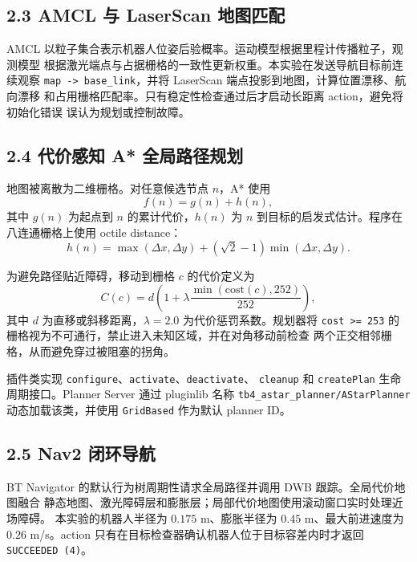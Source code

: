 \documentclass[12pt,a4paper]{ctexart}
\begin{document}
\subsection*{2.3 AMCL 与 LaserScan 地图匹配}

AMCL 以粒子集合表示机器人位姿后验概率。运动模型根据里程计传播粒子，观测模型
根据激光端点与占据栅格的一致性更新权重。本实验在发送导航目标前连续观察
\texttt{map -> base\_link}，并将 LaserScan 端点投影到地图，计算位置漂移、航向漂移
和占用栅格匹配率。只有稳定性检查通过后才启动长距离 action，避免将初始化错误
误认为规划或控制故障。

\subsection*{2.4 代价感知 A* 全局路径规划}

地图被离散为二维栅格。对任意候选节点 $n$，A* 使用
\begin{equation}
  f(n)=g(n)+h(n),
\end{equation}
其中 $g(n)$ 为起点到 $n$ 的累计代价，$h(n)$ 为 $n$ 到目标的启发式估计。程序在
八连通栅格上使用 octile distance：
\begin{equation}
  h(n)=\max(\Delta x,\Delta y)
  +(\sqrt{2}-1)\min(\Delta x,\Delta y).
\end{equation}

为避免路径贴近障碍，移动到栅格 $c$ 的代价定义为
\begin{equation}
  C(c)=d\left(1+\lambda\frac{\min(\mathrm{cost}(c),252)}{252}\right),
\end{equation}
其中 $d$ 为直移或斜移距离，$\lambda=2.0$ 为代价惩罚系数。规划器将
\texttt{cost >= 253} 的栅格视为不可通行，禁止进入未知区域，并在对角移动前检查
两个正交相邻栅格，从而避免穿过被阻塞的拐角。

插件类实现 \texttt{configure}、\texttt{activate}、\texttt{deactivate}、
\texttt{cleanup} 和 \texttt{createPlan} 生命周期接口。Planner Server 通过
pluginlib 名称 \texttt{tb4\_astar\_planner/AStarPlanner} 动态加载该类，并使用
\texttt{GridBased} 作为默认 planner ID。

\subsection*{2.5 Nav2 闭环导航}

BT Navigator 的默认行为树周期性请求全局路径并调用 DWB 跟踪。全局代价地图融合
静态地图、激光障碍层和膨胀层；局部代价地图使用滚动窗口实时处理近场障碍。
本实验的机器人半径为 $0.175$ m、膨胀半径为 $0.45$ m、最大前进速度为
$0.26$ m/s。action 只有在目标检查器确认机器人位于目标容差内时才返回
\texttt{SUCCEEDED (4)}。
\end{document}

